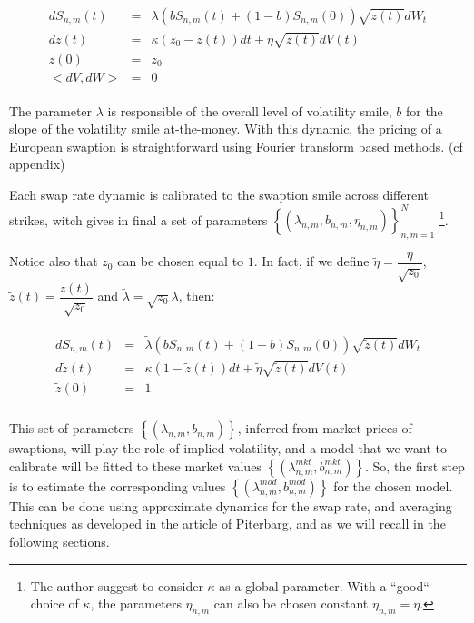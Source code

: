 \documentclass[12pt,a4paper]{article}
\begin{document}
\begin{eqnarray}
\label{simple}
\begin{array}{rll}
  d S_{n,m}(t) &=&  \lambda\left( bS_{n,m}(t) + (1-b)S_{n,m}(0)\right)  \sqrt{z(t)} dW_t\\
  d z(t) &=& \kappa (z_0 - z(t)) dt + \eta \sqrt{z(t)} d V(t) \\
  z(0) &=& z_0 \\
  <d V, d W> &=& 0 
   \end{array}
\end{eqnarray}

The parameter $\lambda$ is responsible of the overall level of volatility smile, $b$ for the slope of the volatility smile at-the-money. With this dynamic, the pricing of a European swaption is straightforward using Fourier transform based methods. (cf appendix)

Each swap rate dynamic is calibrated to the swaption smile across different strikes, witch gives in final a set of parameters $\left\lbrace (\lambda_{n,m}, b_{n,m}, \eta_{n,m})\right\rbrace_{n,m=1}^N$ \footnote{The author suggest to consider $\kappa$ as a global parameter. With a ``good`` choice of $\kappa$,  the parameters $\eta_{n,m}$ can also be chosen constant $\eta_{n,m}=\eta$.}.

Notice also that $z_0$ can be chosen equal to $1$. In fact, if we define $\tilde{\eta} = \dfrac{\eta}{\sqrt{z_0}}$, $\tilde{z}(t) = \dfrac{z(t)}{\sqrt{z_0}}$ and $\tilde{\lambda}=\sqrt{z_0}\lambda$, then:

\begin{eqnarray*}
\begin{array}{rll}
  d S_{n,m}(t) &=&  \tilde{\lambda}\left( bS_{n,m}(t) + (1-b)S_{n,m}(0)\right)  \sqrt{\tilde{z}(t)} dW_t\\
  d \tilde{z}(t) &=& \kappa (1 - \tilde{z}(t)) dt + \tilde{\eta} \sqrt{\tilde{z}(t)} d V(t) \\
  \tilde{z}(0) &=& 1 \\
   \end{array}
\end{eqnarray*}

This set of parameters $\left\lbrace (\lambda_{n,m}, b_{n,m})\right\rbrace$, inferred from market prices of swaptions, will play the role of implied volatility, and a model that we want to calibrate will be fitted to these market values $\left\lbrace (\lambda^{mkt}_{n,m}, b^{mkt}_{n,m})\right\rbrace$. So, the first step is to estimate the corresponding values $\left\lbrace (\lambda^{mod}_{n,m}, b^{mod}_{n,m})\right\rbrace$ for the chosen model. This can be done using approximate dynamics for the swap rate, and averaging techniques as developed in the article of Piterbarg, and as we will recall in the following sections.
\end{document}
